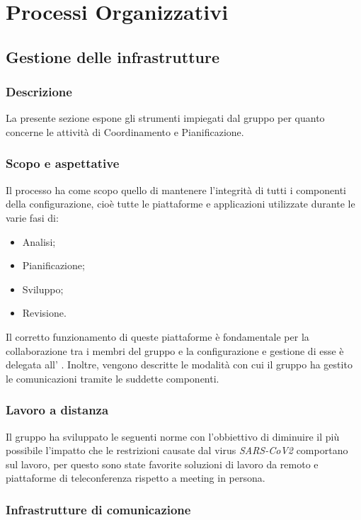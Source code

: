 \section{Processi Organizzativi}
\subsection{Gestione delle infrastrutture}
\subsubsection{Descrizione}
La presente sezione espone gli strumenti impiegati dal gruppo \gruppo{} per quanto concerne le attività di Coordinamento e Pianificazione.

\subsubsection{Scopo e aspettative}
Il processo ha come scopo quello di mantenere l'integrità di tutti i componenti della configurazione, cioè tutte le piattaforme e applicazioni utilizzate durante le varie fasi di:
\begin{itemize}
\item Analisi;
\item Pianificazione;
\item Sviluppo;
\item Revisione.
\end{itemize}
Il corretto funzionamento di queste piattaforme è fondamentale per la collaborazione tra i membri del gruppo e la configurazione e gestione di esse è delegata all' \adm{}. Inoltre, vengono descritte le modalità con cui il gruppo ha gestito le comunicazioni tramite le suddette componenti.

\subsubsection{Lavoro a distanza}
Il gruppo ha sviluppato le seguenti norme con l'obbiettivo di diminuire il più possibile l'impatto che le restrizioni causate dal virus \textit{SARS-CoV2} comportano sul lavoro, per questo sono state favorite soluzioni di lavoro da remoto e piattaforme di teleconferenza rispetto a meeting in persona.

\subsubsection{Infrastrutture di comunicazione}

